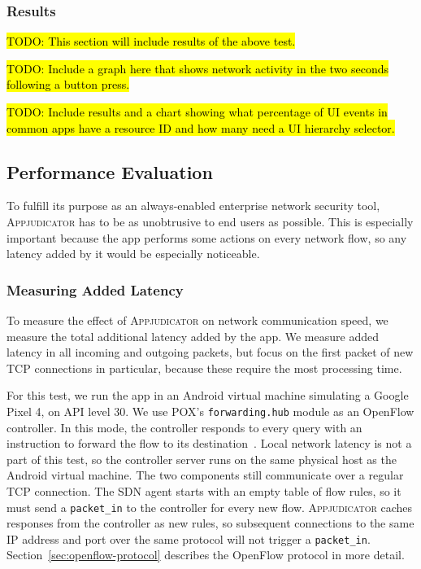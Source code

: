 \subsubsection{Results}
\label{sec:practical-results}

\hl{TODO: This section will include results of the above test.}

\hl{TODO: Include a graph here that shows network activity in the two seconds
following a button press.}

\hl{TODO: Include results and a chart showing what percentage of UI events in
	common apps have a resource ID and how many need a UI hierarchy selector.}

\subsection{Performance Evaluation}
\label{sec:performance-evaluation}

To fulfill its purpose as an always-enabled enterprise network security tool,
\textsc{Appjudicator} has to be as unobtrusive to end users as possible. This is
especially important because the app performs some actions on every network
flow, so any latency added by it would be especially noticeable.

\subsubsection{Measuring Added Latency}
\label{sec:measuring-added-latency}

To measure the effect of \textsc{Appjudicator} on network communication speed,
we measure the total additional latency added by the app. We measure added
latency in all incoming and outgoing packets, but focus on the first packet of
new TCP connections in particular, because these require the most processing
time.

For this test, we run the app in an Android virtual machine simulating a Google
Pixel 4, on API level 30. We use POX's \texttt{forwarding.hub} module as an
OpenFlow controller. In this mode, the controller responds to every query with
an instruction to forward the flow to its destination~\cite{mccauley2015}. Local
network latency is not a part of this test, so the controller server runs on the
same physical host as the Android virtual machine. The two components still
communicate over a regular TCP connection. The SDN agent starts with an empty
table of flow rules, so it must send a \texttt{packet\_in} to the controller for
every new flow. \textsc{Appjudicator} caches responses from the controller as
new rules, so subsequent connections to the same IP address and port over the
same protocol will not trigger a \texttt{packet\_in}.
Section~\ref{sec:openflow-protocol} describes the OpenFlow protocol in more
detail.

